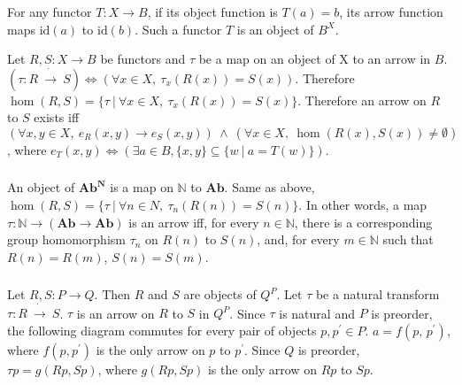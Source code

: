 \documentclass[luatex]{article}
\begin{document}
\subsubsection{}



\showArt

For any functor $T : X \rightarrow B$, if its object function is $T(a) = b$, its arrow function maps $\mathrm{id}(a)$ to $\mathrm{id}(b)$. Such a functor $T$ is an object of $B^X$.

Let $R, S : X \rightarrow B$ be functors and $\tau$ be a map on an object of X to an arrow in $B$. $(\tau : R\ \dot{\rightarrow}\ S) \Leftrightarrow (\forall x \in X,\ \tau_x(R(x)) = S(x))$. Therefore $\hom(R, S) = \{\tau\ |\ \forall x \in X,\ \tau_x(R(x)) = S(x)\}$. Therefore an arrow on $R$ to $S$ exists iff $(\forall x, y \in X,\ e_R(x, y) \rightarrow e_S(x, y))\ \wedge\ (\forall x \in X,\ \hom(R(x), S(x)) \neq \emptyset)$, where $e_T(x, y) \Leftrightarrow (\exists a \in B, \{x, y\} \subseteq \{ w\ |\ a = T(w) \})$.

\subsubsection{}



\showArt

An object of $\mathbf{Ab}^{\mathbf{N}}$ is a map on $\mathbb{N}$ to $\mathbf{Ab}$. Same as above, $\hom(R, S) = \{\tau\ |\ \forall n \in N,\ \tau_n(R(n)) = S(n)\}$. In other words, a map $\tau : \mathbb{N} \rightarrow (\mathbf{Ab} \rightarrow \mathbf{Ab})$ is an arrow iff, for every $n \in \mathbb{N}$, there is a corresponding group homomorphism $\tau_n$ on $R(n)$ to $S(n)$, and, for every $m \in \mathbb{N}$ such that $R(n) = R(m)$, $S(n) = S(m)$. 

\subsubsection{}



\showArt

Let $R, S : P \rightarrow Q$. Then $R$ and $S$ are objects of $Q^P$. Let $\tau$ be a natural transform $\tau : R\ \dot{\rightarrow}\ S$. $\tau$ is an arrow on $R$ to $S$ in $Q^P$. Since $\tau$ is natural and $P$ is preorder, the following diagram commutes for every pair of objects $p, p^\prime \in P$. $a = f(p,\,p^\prime)$, where $f(p, p^\prime)$ is the only arrow on $p$ to $p^\prime$. Since $Q$ is preorder, $\tau p = g(Rp, Sp)$, where $g(Rp, Sp)$ is the only arrow on $Rp$ to $Sp$.
\end{document}

